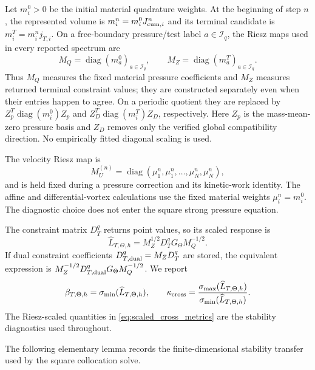 \documentclass[11pt]{article}
\theoremstyle{plain}
\theoremstyle{definition}
\theoremstyle{remark}
\newcommand{\diag}{\operatorname{diag}}
\newcommand{\Th}{\Theta}
\begin{document}
Let $m_i^0>0$ be the initial material quadrature weights.  At the beginning of
step $n$, the represented volume is
$m_i^n=m_i^0J_{{\rm cum},i}^n$ and its terminal candidate is
$m_i^T=m_i^nj_{T,i}$.  On a free-boundary pressure/test label
$a\in\mathcal I_q$, the Riesz maps used in every reported spectrum are
\begin{equation}
 M_Q=\diag(m_a^0)_{a\in\mathcal I_q},
 \qquad
 M_Z=\diag(m_a^T)_{a\in\mathcal I_q}.
 \label{eq:free_boundary_riesz_maps}
\end{equation}
Thus $M_Q$ measures the fixed material pressure coefficients and $M_Z$ measures
returned terminal constraint values; they are constructed separately even when
their entries happen to agree.  On a periodic quotient they are replaced by
$Z_p^T\diag(m_i^0)Z_p$ and $Z_D^T\diag(m_i^T)Z_D$, respectively.  Here $Z_p$
is the mass-mean-zero pressure basis and $Z_D$ removes only the verified global
compatibility direction.  No empirically fitted diagonal scaling is used.

The velocity Riesz map is
\begin{equation}
 M_U^{(n)}=\diag(\mu_1^n,\mu_1^n,\ldots,\mu_N^n,\mu_N^n),
 \label{eq:velocity_mass_matrix}
\end{equation}
and is held fixed during a pressure correction and its kinetic-work identity.
The affine and differential-vortex calculations use the fixed material
weights $\mu_i^n=m_i^0$.  The diagnostic choice does not enter the square
strong pressure equation.

The constraint matrix $D_T^q$ returns point values, so its scaled response is
\begin{equation}
 \widehat L_{T,\Th,h}
 =M_Z^{1/2}D_T^qG_\Th M_Q^{-1/2}.
 \label{eq:riesz_scaled_response}
\end{equation}
If dual constraint coefficients $D_{T,{\rm dual}}^q=M_ZD_T^q$ are stored,
the equivalent expression is
$M_Z^{-1/2}D_{T,{\rm dual}}^qG_\Th M_Q^{-1/2}$.
We report
\begin{equation}
 \beta_{T,\Th,h}=\sigma_{\min}(\widehat L_{T,\Th,h}),
 \qquad
 \kappa_{\rm cross}=
 \frac{\sigma_{\max}(\widehat L_{T,\Th,h})}
      {\sigma_{\min}(\widehat L_{T,\Th,h})}.
 \label{eq:scaled_cross_metrics}
\end{equation}
The Riesz-scaled quantities in \eqref{eq:scaled_cross_metrics} are the
stability diagnostics used throughout.

The following elementary lemma records the finite-dimensional stability
transfer used by the square collocation solve.
\end{document}
